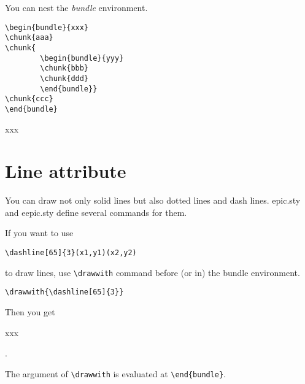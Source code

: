 You can nest the {\it bundle} environment.

\noindent\begin{minipage}{0.6\textwidth}
\begin{verbatim}
\begin{bundle}{xxx}
\chunk{aaa}
\chunk{
        \begin{bundle}{yyy}
        \chunk{bbb}
        \chunk{ddd}
        \end{bundle}}
\chunk{ccc}
\end{bundle}
\end{verbatim}
\end{minipage}\begin{minipage}{0.4\textwidth}
\begin{bundle}{xxx}
\end{bundle}
\end{minipage}


\section{Line attribute}

You can draw not only solid lines but also
dotted lines and dash lines.
epic.sty and eepic.sty define several commands for them.

If you want to use
\begin{verbatim}
\dashline[65]{3}(x1,y1)(x2,y2)
\end{verbatim}
to draw lines, use \verb|\drawwith| command
before (or in) the bundle environment.
\begin{verbatim}
\drawwith{\dashline[65]{3}}
\end{verbatim}

Then you get
\begin{bundle}{xxx}
\end{bundle}.

The argument of \verb|\drawwith| is evaluated
at \verb|\end{bundle}|. 

